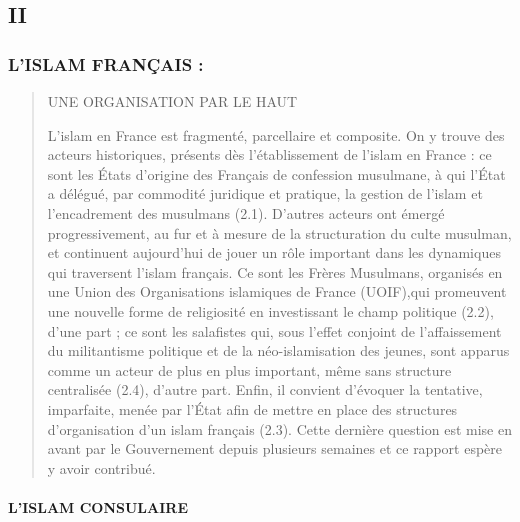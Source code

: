 \hypertarget{ii}{%
\subsection{II}\label{ii}}

\hypertarget{lislam-franuxe7ais}{%
\subsubsection{L'ISLAM FRANÇAIS :}\label{lislam-franuxe7ais}}

\begin{quote}
UNE ORGANISATION PAR LE HAUT

L'islam en France est fragmenté, parcellaire et composite. On y trouve
des acteurs historiques, présents dès l'établissement de l'islam en
France : ce sont les États d'origine des Français de confession
musulmane, à qui l'État a délégué, par commodité juridique et pratique,
la gestion de l'islam et l'encadrement des musulmans (2.1). D'autres
acteurs ont émergé progressivement, au fur et à mesure de la
structuration du culte musulman, et continuent aujourd'hui de jouer un
rôle important dans les dynamiques qui traversent l'islam français. Ce
sont les Frères Musulmans, organisés en une Union des Organisations
islamiques de France (UOIF),qui promeuvent une nouvelle forme de
religiosité en investissant le champ politique (2.2), d'une part ; ce
sont les salafistes qui, sous l'effet conjoint de l'affaissement du
militantisme politique et de la néo-islamisation des jeunes, sont
apparus comme un acteur de plus en plus important, même sans structure
centralisée (2.4), d'autre part. Enfin, il convient d'évoquer la
tentative, imparfaite, menée par l'État afin de mettre en place des
structures d'organisation d'un islam français (2.3). Cette dernière
question est mise en avant par le Gouvernement depuis plusieurs semaines
et ce rapport espère y avoir contribué.
\end{quote}

\hypertarget{lislam-consulaire}{%
\paragraph{L'ISLAM CONSULAIRE}\label{lislam-consulaire}}

